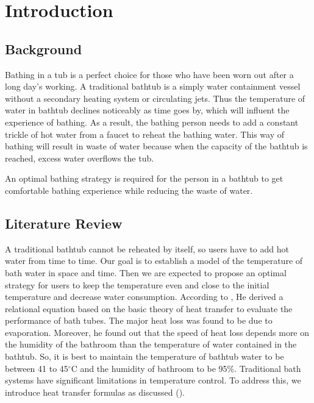 \documentclass{mcmthesis}
\renewcommand{\contentsname}{\hspace*{\fill}\Large\bfseries Contents \hspace*{\fill}}
\begin{document}
\maketitle

\tableofcontents        %
\thispagestyle{empty}

\newpage

\section{Introduction}

\subsection{Background}

Bathing in a tub is a perfect choice for those who have been worn out after a 
long day's working. A traditional bathtub is a simply water containment vessel 
without a secondary heating system or circulating jets. Thus the temperature of 
water in bathtub declines noticeably as time goes by, which will influent the 
experience of bathing. As a result, the bathing person needs to add a constant 
trickle of hot water from a faucet to reheat the bathing water. This way of 
bathing will result in waste of water because when the capacity of the bathtub 
is reached, excess water overflows the tub.

An optimal bathing strategy is required for the person in a bathtub to get 
comfortable bathing experience while reducing the waste of water.

\subsection{Literature Review}

A traditional bathtub cannot be reheated by itself, so users have to add hot 
water from time to time. Our goal is to establish a model of the temperature 
of bath water in space and time. Then we are expected to propose an optimal 
strategy for users to keep the temperature even and close to the initial 
temperature and decrease water consumption. According to \textcite{kim2006}, 
He derived a relational equation based on the basic theory of heat transfer 
to evaluate the performance of bath tubes. The major heat loss was found to be 
due to evaporation. Moreover, he found out that the speed of heat loss depends 
more on the humidity of the bathroom than the temperature of water contained 
in the bathtub. So, it is best to maintain the temperature of bathtub water to 
be between 41 to 45$^{\circ}$C and the humidity of bathroom to be 95\%. 
Traditional bath systems have significant limitations in temperature control. 
To address this, we introduce heat transfer formulas as 
discussed (\cite[123]{holman2002}). 
\end{document}
